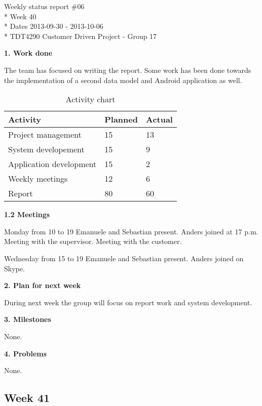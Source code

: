 \begin{center}
Weekly status report \#06\\*
Week 40 \\*
Dates 2013-09-30 - 2013-10-06 \\*
TDT4290 Customer Driven Project - Group 17
\end{center}

\textbf{1. Work done}

The team has focused on writing the report. Some work has been done towards
the implementation of a second data model and Android application as well.

\begin{table}[H]
\begin{center}
\begin{tabular}{ l | l | l }
  \hline
  Activity & Planned & Actual \\
  \hline\noalign{\smallskip}\noalign{\smallskip}\hline
  Project management & 15 & 13 \\
  System developement & 15 & 9 \\
  Application development & 15 & 2 \\
  Weekly meetings & 12 & 6 \\
  Report & 80 & 60 \\
  \hline
\end{tabular}
\end{center}
\caption{Activity chart}
\label{table:activityChartStatusReportWeek40}
\end{table}

\textbf{1.2 Meetings}

Monday from 10 to 19
Emanuele and Sebastian present. Anders joined at 17 p.m.
Meeting with the supervisor. Meeting with the customer.

Wednesday from 15 to 19
Emanuele and Sebastian present. Anders joined on Skype.

\textbf{2. Plan for next week}

During next week the group will focus on report work and system development.

\textbf{3. Milestones}

None.

\textbf{4. Problems}

None.

\newpage
\subsection{Week 41}

